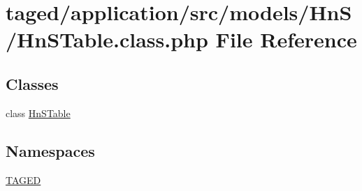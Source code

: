 \hypertarget{_hn_s_table_8class_8php}{}\section{taged/application/src/models/\+Hn\+S/\+Hn\+S\+Table.class.\+php File Reference}
\label{_hn_s_table_8class_8php}
\subsection*{Classes}
\begin{DoxyCompactItemize}
\item 
class \hyperlink{class_hn_s_table}{Hn\+S\+Table}
\end{DoxyCompactItemize}
\subsection*{Namespaces}
\begin{DoxyCompactItemize}
\item 
 \hyperlink{namespace_t_a_g_e_d}{T\+A\+G\+ED}
\end{DoxyCompactItemize}
